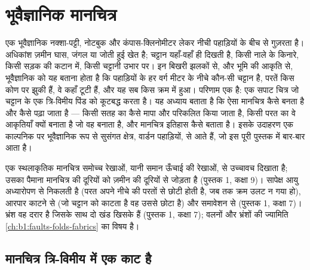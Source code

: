 \chapter{भूवैज्ञानिक मानचित्र}\label{ch:b1:geological-maps}

एक भूवैज्ञानिक नक्शा-पट्टी, नोटबुक और कंपास-क्लिनोमीटर लेकर नीची पहाड़ियों के बीच से गुज़रता है। अधिकांश ज़मीन
घास, जंगल या जोती हुई खेत है; चट्टान यहाँ-वहाँ ही दिखती है, किसी नाले के किनारे, किसी सड़क की कटान में,
किसी चट्टानी उभार पर। इन बिखरी झलकों से, और भूमि की आकृति से, भूवैज्ञानिक को यह बताना होता है कि
पहाड़ियों के हर वर्ग मीटर के नीचे कौन-सी चट्टान है, परतें किस कोण पर झुकी हैं, वे कहाँ टूटी हैं, और यह
सब किस क्रम में हुआ। परिणाम एक  है: एक सपाट चित्र जो चट्टान के एक त्रि-विमीय पिंड को
कूटबद्ध करता है। यह अध्याय बताता है कि ऐसा मानचित्र कैसे बनता है और कैसे पढ़ा जाता है --- किसी सतह का
 कैसे मापा और परिकलित किया जाता है, किसी परत का  वे आकृतियाँ क्यों बनाता है जो वह बनाता
है, और मानचित्र इतिहास कैसे बताता है। इसके उदाहरण एक काल्पनिक पर भूवैज्ञानिक रूप से सुसंगत क्षेत्र, वार्डन
पहाड़ियों, से आते हैं, जो इस पूरी पुस्तक में बार-बार आता है।

\begin{recall}
एक स्थलाकृतिक मानचित्र समोच्च रेखाओं, यानी समान ऊँचाई की रेखाओं, से उच्चावच दिखाता है; उसका पैमाना मानचित्र
की दूरियों को ज़मीन की दूरियों से जोड़ता है (पुस्तक 1, कक्षा 9)। सापेक्ष आयु अध्यारोपण से निकलती है
(परत अपने नीचे की परतों से छोटी होती है, जब तक क्रम उलट न गया हो), आरपार काटने से (जो चट्टान को काटता
है वह उससे छोटा है) और समावेशन से (पुस्तक 1, कक्षा 7)। भ्रंश वह दरार है जिसके साथ दो खंड खिसके हैं
(पुस्तक 1, कक्षा 7); वलनों और भ्रंशों की ज्यामिति \cref{ch:b1:faults-folds-fabrics} का विषय है।
\end{recall}

\section{मानचित्र त्रि-विमीय में एक काट है}\label{sec:b1:geological-maps:cut}

